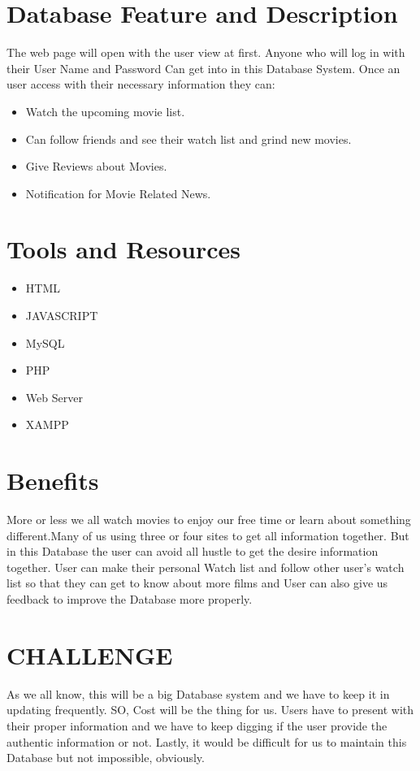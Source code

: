 \documentclass{report}
\begin{document}
\section{Database Feature and Description}
The web page will open with the user view at first. Anyone who will log in with their User Name and Password Can get into in this Database System. 
Once an user access with their necessary information they can:
\begin{itemize}
\item Watch the upcoming movie list. 
\item Can follow friends and see their watch list and grind new movies. 
\item Give Reviews about Movies. 

\item Notification for Movie Related News.  
\end{itemize}

\section{Tools and Resources}
\begin{itemize}
\item HTML
\item JAVASCRIPT
\item MySQL
\item PHP
\item Web Server
\item XAMPP
\end{itemize}

\section{Benefits}
More or less we all watch movies to enjoy our free time or learn about something different.Many of us using three or four sites to get all information together. But in this Database the user can avoid all hustle to get the desire information together. User can make their personal Watch list and follow other user's watch list so that they can get to know about more films and 
User can also give us feedback to improve the Database more properly. 

\newpage
\section{CHALLENGE}
As we all know, this will be a big Database system and we have to keep it in updating frequently. SO, Cost will be the thing for us. Users have to present with their proper information and we have to keep digging if the user provide the authentic information or not. Lastly, it would be difficult for us to maintain this Database but not impossible,  obviously.  
\end{document}
